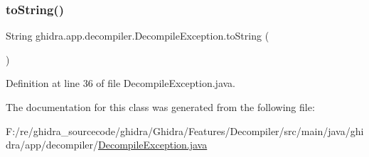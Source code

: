 \subsubsection{\texorpdfstring{toString()}{toString()}}
{\footnotesize\ttfamily String ghidra.\+app.\+decompiler.\+Decompile\+Exception.\+to\+String (\begin{DoxyParamCaption}{ }\end{DoxyParamCaption})\hspace{0.3cm}{\ttfamily [inline]}}



Definition at line 36 of file Decompile\+Exception.\+java.



The documentation for this class was generated from the following file\+:\begin{DoxyCompactItemize}
\item 
F\+:/re/ghidra\+\_\+sourcecode/ghidra/\+Ghidra/\+Features/\+Decompiler/src/main/java/ghidra/app/decompiler/\mbox{\hyperlink{_decompile_exception_8java}{Decompile\+Exception.\+java}}\end{DoxyCompactItemize}

